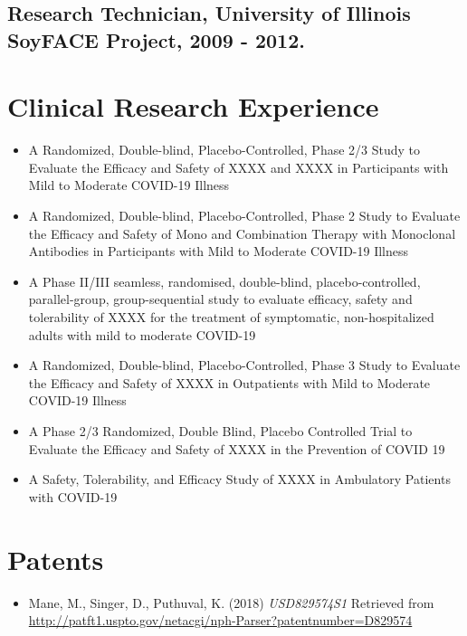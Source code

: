 \documentclass[letterpaper]{article}
\begin{document}
  \subsection*{Research Technician, University of Illinois SoyFACE Project, 2009 - 2012.}

\section*{Clinical Research Experience}

  \begin{itemize}

    \item A Randomized, Double-blind, Placebo-Controlled, Phase 2/3 Study to Evaluate the Efficacy and Safety of XXXX and XXXX in Participants with Mild to Moderate COVID-19 Illness
    \item A Randomized, Double-blind, Placebo-Controlled, Phase 2 Study to Evaluate the Efficacy and Safety of Mono and Combination Therapy with Monoclonal Antibodies in Participants with Mild to Moderate COVID-19 Illness
    \item A Phase II/III seamless, randomised, double-blind, placebo-controlled, parallel-group, group-sequential study to evaluate efficacy, safety and tolerability of XXXX for the treatment of symptomatic, non-hospitalized adults with mild to moderate COVID-19
    \item A Randomized, Double-blind, Placebo-Controlled, Phase 3 Study to Evaluate the Efficacy and Safety of XXXX in Outpatients with Mild to Moderate COVID-19 Illness
    \item A Phase 2/3 Randomized, Double Blind, Placebo Controlled Trial to Evaluate the Efficacy and Safety of XXXX in the Prevention of COVID 19
    \item A Safety, Tolerability, and Efficacy Study of XXXX in Ambulatory Patients with COVID-19

  \end{itemize}

\section*{Patents}

  \begin{itemize}
    \item Mane, M., Singer, D., Puthuval, K. (2018) {\it USD829574S1} Retrieved from \href{http://patft1.uspto.gov/netacgi/nph-Parser?patentnumber=D829574}{http://patft1.uspto.gov/netacgi/nph-Parser?patentnumber=D829574}
  \end{itemize}
\end{document}
